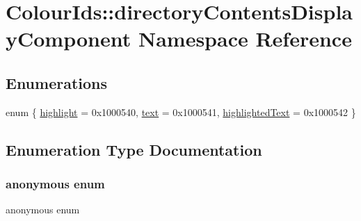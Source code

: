 \hypertarget{namespaceColourIds_1_1directoryContentsDisplayComponent}{}\section{Colour\+Ids\+:\+:directory\+Contents\+Display\+Component Namespace Reference}
\label{namespaceColourIds_1_1directoryContentsDisplayComponent}
\subsection*{Enumerations}
\begin{DoxyCompactItemize}
\item 
enum \{ \mbox{\hyperlink{namespaceColourIds_1_1directoryContentsDisplayComponent_a044e484cdb184ce3c7bc2b5ebdb2bf64a692f29547ebf1d0e7e6506a304f0c56d}{highlight}} = 0x1000540, 
\mbox{\hyperlink{namespaceColourIds_1_1directoryContentsDisplayComponent_a044e484cdb184ce3c7bc2b5ebdb2bf64a4fe26db4964ec606f328bf64d3536191}{text}} = 0x1000541, 
\mbox{\hyperlink{namespaceColourIds_1_1directoryContentsDisplayComponent_a044e484cdb184ce3c7bc2b5ebdb2bf64a9c1cec64d4f5084d85e33e7a639924dc}{highlighted\+Text}} = 0x1000542
 \}
\end{DoxyCompactItemize}


\subsection{Enumeration Type Documentation}
\mbox{\label{namespaceColourIds_1_1directoryContentsDisplayComponent_a044e484cdb184ce3c7bc2b5ebdb2bf64}} 
\subsubsection{\texorpdfstring{anonymous enum}{anonymous enum}}
{\footnotesize\ttfamily anonymous enum}

